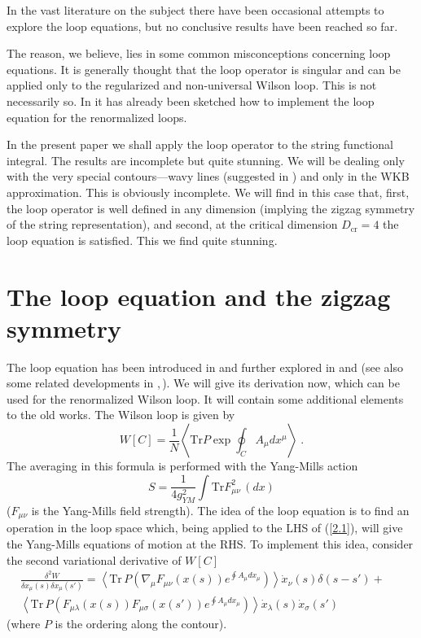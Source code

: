 \documentclass[a4paper,12pt]{article}
\numberwithin{equation}{section}
\begin{document}
In the vast literature on the subject there have been occasional attempts to
explore the loop equations, but no conclusive results have been reached so far.

The reason, we believe, lies in some common misconceptions concerning loop equations.
It is generally thought that the loop operator is singular and can be applied
only to the regularized and non-universal Wilson loop. This is not necessarily
so. In \cite{6} it has already been sketched how to implement the loop equation
for the renormalized loops.

In the present paper we shall apply the loop operator to the string functional
integral. The results are incomplete but quite stunning. We will be dealing
only with the very special contours---wavy lines (suggested in \cite{1}) and
only in the WKB approximation. This is obviously incomplete. We will find in
this case that, first, the loop operator is well defined in any dimension (implying
the zigzag symmetry of the string representation), and second, at the critical
dimension \( D_{\textrm{cr}}=4 \) the loop equation is satisfied. This we find
quite stunning.


\section{The loop equation and the zigzag symmetry}

The loop equation has been introduced in \cite{7} and further explored in \cite{6}
and \cite{8} (see also some related developments in \cite{9},\( \,  \)\cite{10}).
We will give its derivation now, which can be used for the renormalized Wilson
loop. It will contain some additional elements to the old works. The Wilson
loop is given by
\begin{equation}
\label{2.1}
W[C]=\frac{1}{N}\left\langle \textrm{Tr}P\exp \oint _{C}A_{\mu }dx^{\mu }\right\rangle \; .
\end{equation}
 The averaging in this formula is performed with the Yang-Mills action
\[
S=\frac{1}{4g_{YM}^{2}}\int \textrm{Tr}F_{\mu \nu }^{2}\, (dx)\]
 (\( F_{\mu \nu } \) is the Yang-Mills field strength). The idea of the loop
equation is to find an operation in the loop space which, being applied to the
LHS of (\ref{2.1}), will give the Yang-Mills equations of motion at the RHS.
To implement this idea, consider the second variational derivative of \( W[C] \)
\begin{eqnarray}
\frac{\delta ^{2}W}{\delta x_{\mu }(s)\delta x_{\mu }(s')}=\left\langle \textrm{Tr}\, P\left( \nabla _{\mu }F_{\mu \nu }(x(s))e^{\oint A_{\mu }dx_{\mu }}\right) \right\rangle \dot{x}_{\nu }(s)\delta (s-s')+ &  & \nonumber \\
\left\langle \textrm{Tr}\, P\left( F_{\mu \lambda }(x(s))F_{\mu \sigma }(x(s'))e^{\oint A_{\mu }dx_{\mu }}\right) \right\rangle \dot{x}_{\lambda }(s)\dot{x}_{\sigma }(s') &  & \label{2.2} 
\end{eqnarray}
 (where \( P \) is the ordering along the contour).
\end{document}
